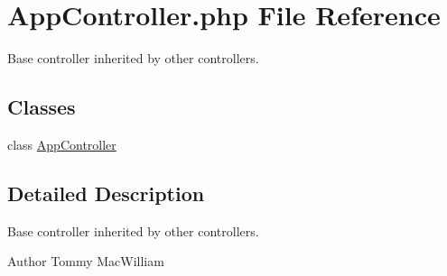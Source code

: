 \hypertarget{AppController_8php}{
\section{\-App\-Controller.php \-File \-Reference}
\label{AppController_8php}
}


\-Base controller inherited by other controllers.  


\subsection*{\-Classes}
\begin{DoxyCompactItemize}
\item 
class \hyperlink{classAppController}{\-App\-Controller}
\end{DoxyCompactItemize}


\subsection{\-Detailed \-Description}
\-Base controller inherited by other controllers. \begin{DoxyAuthor}{\-Author}
\-Tommy \-Mac\-William 
\end{DoxyAuthor}
